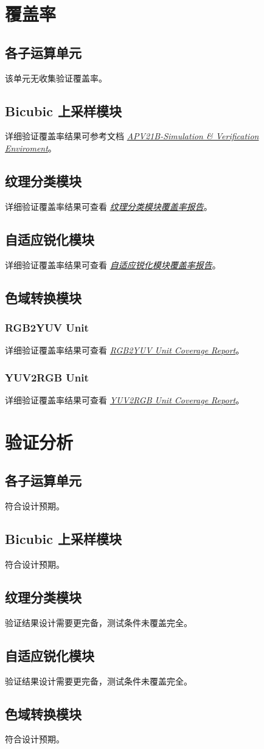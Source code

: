 \documentclass[12pt, a4paper, oneside]{ctexbook}
\begin{document}
	\chapter{覆盖率}
	\section{各子运算单元}
	该单元无收集验证覆盖率。
	\section{Bicubic 上采样模块}
	详细验证覆盖率结果可参考文档 \href{./ref/APV21B_Simulation_Verification_Enviroment.pdf}{\textit{APV21B-Simulation \& Verification Enviroment}}。
	\section{纹理分类模块}
	详细验证覆盖率结果可查看 \href{file:./coverage_report/textureclassifier/dashboard.html}{\textit{纹理分类模块覆盖率报告}}。
	\section{自适应锐化模块}
	详细验证覆盖率结果可查看 \href{file:./coverage_report/adaptedSharpener/dashboard.html}{\textit{自适应锐化模块覆盖率报告}}。
	\section{色域转换模块}
		\subsection{RGB2YUV Unit}
		详细验证覆盖率结果可查看 \href{file:./coverage_report/rgb2yuv/dashboard.html}{\textit{RGB2YUV Unit Coverage Report}}。
		\subsection{YUV2RGB Unit}
		详细验证覆盖率结果可查看 \href{file:./coverage_report/yuv2rgb/dashboard.html}{\textit{YUV2RGB Unit Coverage Report}}。
	
	\chapter{验证分析}
	\section{各子运算单元}
	符合设计预期。
	\section{Bicubic 上采样模块}
	符合设计预期。
	\section{纹理分类模块}
	验证结果设计需要更完备，测试条件未覆盖完全。
	\section{自适应锐化模块}
	验证结果设计需要更完备，测试条件未覆盖完全。
	\section{色域转换模块}
	符合设计预期。
\end{document}
